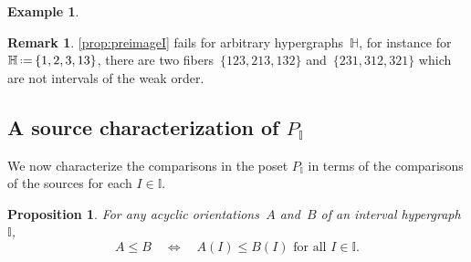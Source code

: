 \documentclass[reqno]{amsart}
\newtheorem{proposition}[theorem]{Proposition}
\theoremstyle{definition}
\newtheorem{example}[theorem]{Example}
\newtheorem{remark}[theorem]{Remark}
\newcommand{\eqdef}{\mbox{\,\raisebox{0.2ex}{\scriptsize\ensuremath{\mathrm:}}\ensuremath{=}\,}} %
\newcommand{\vincent}[1]{\todo[color=blue!30]{#1 \\ \hfill --- V.}}
\newcommand{\HH}{\mathbb H}  %
\newcommand{\II}{\mathbb I} %
\begin{document}
\begin{example}
\vincent{todo}
\end{example}

\begin{remark}
\cref{prop:preimageI} fails for arbitrary hypergraphs~$\HH$, for instance for~$\HH \eqdef \{1,2,3,13\}$, there are two fibers~$\{123, 213, 132\}$ and~$\{231, 312, 321\}$ which are not intervals of the weak order.
\end{remark}


\subsection{A source characterization of $P_\II$}  
\label{subsec:sourceAcyclicI}

We now characterize the comparisons in the poset $P_\II$ in terms of the comparisons of the sources for each $I\in \II$.

\begin{proposition}
\label{prop:sourceOrderI}
For any acyclic orientations~$A$ and~$B$ of an interval hypergraph~$\II$,
\[
A \le B \quad \iff \quad A(I) \le B(I) \text{ for all } I \in \II .
\]
\end{proposition}
\end{document}
